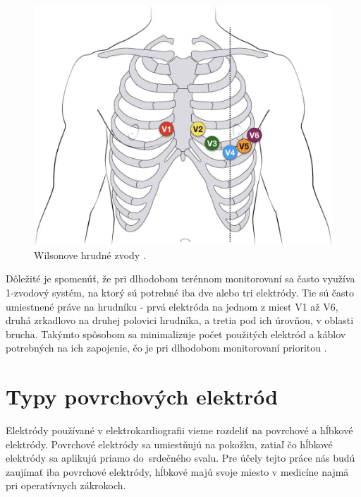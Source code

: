 \begin{figure}[H]
    \centering
    \includegraphics[scale=0.25]{img/12-lead-ECG-lead-placemnet.jpg}
    \caption{Wilsonove hrudné zvody \cite{Cadogan_2022}.}
    \label{fig:wilson}
\end{figure}

Dôležité je spomenúť, že pri dlhodobom terénnom monitorovaní sa často využíva 1-zvodový systém, na ktorý sú potrebné iba dve alebo tri elektródy. Tie sú často umiestnené práve na hrudníku - prvá elektróda na jednom z miest V1 až V6, druhá zrkadlovo na druhej polovici hrudníka, a tretia pod ich úrovňou, v oblasti brucha. Takýmto spôsobom sa minimalizuje počet použitých elektród a káblov potrebných na ich zapojenie, čo je pri dlhodobom monitorovaní prioritou \cite{Thakor1980}.


\section{Typy povrchových elektród}

Elektródy používané v elektrokardiografii vieme rozdeliť na povrchové a hĺbkové elektródy. Povrchové elektródy sa umiestňujú na pokožku, zatiaľ čo hĺbkové elektródy sa aplikujú priamo do~srdečného svalu. Pre účely tejto práce nás budú zaujímať iba povrchové elektródy, hĺbkové majú svoje miesto v medicíne najmä pri operatívnych zákrokoch. 


